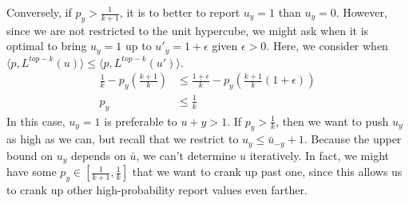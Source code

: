 \documentclass[12pt]{article}
\newcommand{\ubar}{\bar{u}}
\newcommand{\inprod}[2]{\langle #1, #2 \rangle}%
\newcommand{\ones}{\mathbbm{1}}
\begin{document}
Conversely, if $p_y > \frac{1}{k+1}$, it is to better to report $u_y = 1$ than $u_y = 0$.
However, since we are not restricted to the unit hypercube, we might ask when it is optimal to bring $u_y = 1$ up to $u'_y = 1 + \epsilon$ given $\epsilon > 0$.
Here, we consider when $\inprod{p}{L^{top-k}(u)} \leq \inprod{p}{L^{top-k}(u')}$.
\begin{align*}
\frac{1}{k} - p_y (\frac{k+1}{k}) &\leq \frac{1+\epsilon}{k} - p_y (\frac{k+1}{k}(1 + \epsilon))\\
p_y &\leq \frac{1}{k}
\end{align*}
In this case, $u_y=1$ is preferable to $u+y >1$.
If $p_y > \frac 1 k$, then we want to push $u_y$ as high as we can, but recall that we restrict to $u_y \leq \ubar_{-y} + 1$.
Because the upper bound on $u_y$ depends on $\ubar$, we can't determine $u$ iteratively.
In fact, we might have some $p_y \in [\frac 1 {k+1}, \frac 1 k]$ that we want to crank up past one, since this allows us to crank up other high-probability report values even farther.
\end{document}
